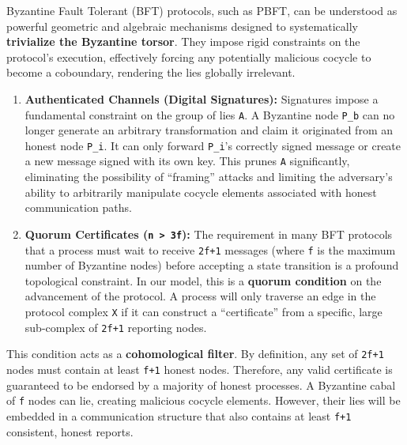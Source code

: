 \documentclass[
]{article}
\begin{document}
Byzantine Fault Tolerant (BFT) protocols, such as PBFT, can be
understood as powerful geometric and algebraic mechanisms designed to
systematically \textbf{trivialize the Byzantine torsor}. They impose
rigid constraints on the protocol's execution, effectively forcing any
potentially malicious cocycle to become a coboundary, rendering the lies
globally irrelevant.

\begin{enumerate}
\def\labelenumi{\arabic{enumi}.}
\item
  \textbf{Authenticated Channels (Digital Signatures):} Signatures
  impose a fundamental constraint on the group of lies \texttt{A}. A
  Byzantine node \texttt{P\_b} can no longer generate an arbitrary
  transformation and claim it originated from an honest node
  \texttt{P\_i}. It can only forward \texttt{P\_i}'s correctly signed
  message or create a new message signed with its own key. This prunes
  \texttt{A} significantly, eliminating the possibility of ``framing''
  attacks and limiting the adversary's ability to arbitrarily manipulate
  cocycle elements associated with honest communication paths.
\item
  \textbf{Quorum Certificates (\texttt{n\ \textgreater{}\ 3f}):} The
  requirement in many BFT protocols that a process must wait to receive
  \texttt{2f+1} messages (where \texttt{f} is the maximum number of
  Byzantine nodes) before accepting a state transition is a profound
  topological constraint. In our model, this is a \textbf{quorum
  condition} on the advancement of the protocol. A process will only
  traverse an edge in the protocol complex \texttt{X} if it can
  construct a ``certificate'' from a specific, large sub-complex of
  \texttt{2f+1} reporting nodes.
\end{enumerate}

This condition acts as a \textbf{cohomological filter}. By definition,
any set of \texttt{2f+1} nodes must contain at least \texttt{f+1} honest
nodes. Therefore, any valid certificate is guaranteed to be endorsed by
a majority of honest processes. A Byzantine cabal of \texttt{f} nodes
can lie, creating malicious cocycle elements. However, their lies will
be embedded in a communication structure that also contains at least
\texttt{f+1} consistent, honest reports.
\end{document}
